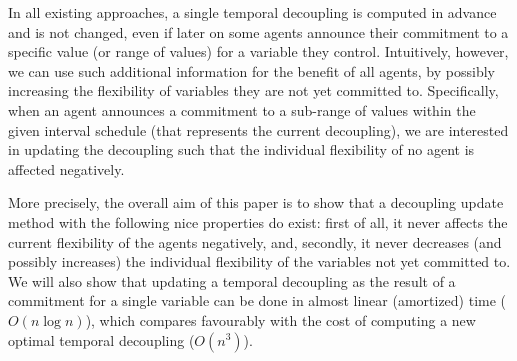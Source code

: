 {%
In all existing approaches, a single temporal decoupling is computed in advance and is not changed, 
even if later on some agents announce their commitment to a specific value (or range of values) for a variable they control. 
Intuitively, however, we can use such additional information for the benefit of all agents, by possibly increasing the flexibility of variables they are not yet committed to. Specifically, when an agent announces a commitment to a sub-range of values within the given interval schedule (that represents the current decoupling), we are interested in updating the decoupling such that the individual flexibility of no agent is affected negatively. 

More precisely, the overall aim of this paper is to show that a decoupling update method with the following nice properties do exist:  first of all, 
it never affects the current flexibility of the agents negatively, and, secondly, it never decreases (and possibly increases) the individual flexibility of the variables not yet committed to.
We will also show that updating a temporal decoupling as the result of a commitment for a single variable can be done in almost linear (amortized) time ($O(n \log n)$), 
which compares favourably with the cost of computing a new optimal temporal decoupling ($O(n^3)$).

}
